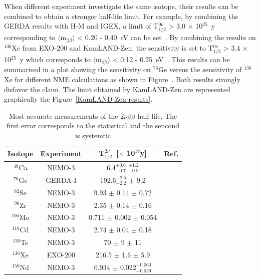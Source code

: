 \documentclass[main.tex]{subfiles}
\begin{document}
\NI When different experiment investigate the same isotope, their results can be combined to obtain a stronger half-life limit. For example, by combining the GERDA results with H-M and IGEX, a limit of T$_{\text{1/2}}^{\text{0}\nu}$ > 3.0 $\times$ 10$^{\text{25}}$~y corresponding to $\langle \text{m}_{\beta\beta} \rangle$ < 0.20 - 0.40~eV can be set~\cite{GERDA}.  By combining the results on $^{\text{136}}$Xe from EXO-200 and KamLAND-Zen, the sensitivity is set to T$_{\text{1/2}}^{\text{0}\nu}$ > 3.4 $\times$ 10$^{\text{25}}$~y which corresponds to $\langle \text{m}_{\beta\beta} \rangle$ < 0.12 - 0.25~eV~\cite{KamLAND-Zen}. This results can be summarised in a plot showing the sensitivity on $^{\text{76}}$Ge versus the sensitivity of $^{\text{136}}$Xe for different NME calculations as shown in Figure~\cite{Gerda-EXO-combined}. Both results strongly disfavor the claim. The limit obtained by KamLAND-Zen are represented graphically the Figure~\ref{KamLAND-Zen-results}.


\begin{table}[h!]
\centering
\begin{tabular}{cccc}
\toprule
Isotope & Experiment & T$_{\text{1/2}}^{\text{2}\nu}$~[$\times$ 10$^{\text{19}}$y]& Ref. \\
\midrule
$^{\text{48}}$Ca  & NEMO-3  & 6.4$^{+\text{0.6}}_{-\text{0.7}}$ $^{+\text{1.2}}_{-\text{0.9}}$ & \cite{NEMO3:Ca48} \\[0.1cm]
$^{\text{76}}$Ge  & GERDA-I & 192.6$^{+\text{2.5}}_{-\text{2.2}}$ $\pm$ 9.2 & \cite{Gerda2nubb} \\[0.1cm]
$^{\text{82}}$Se  & NEMO-3  & 9.93 $\pm$ 0.14 $\pm$ 0.72 & \cite{ThesisJMott} \\[0.1cm]
$^{\text{96}}$Zr  & NEMO-3  & 2.35 $\pm$ 0.14 $\pm$ 0.16 & \cite{NEMO3:Zr96} \\[0.1cm]
$^{\text{100}}$Mo & NEMO-3  & 0.711 $\pm$ 0.002 $\pm$ 0.054 & \cite{NEMO3:Mo100-pre} \\[0.1cm]
$^{\text{116}}$Cd & NEMO-3  & 2.74 $\pm$ 0.04 $\pm$ 0.18 & \cite{Arnold2016bed} \\[0.1cm]
$^{\text{130}}$Te & NEMO-3  & 70 $\pm$ 9 $\pm$ 11 & \cite{NEMO3:Te130} \\[0.1cm]
$^{\text{136}}$Xe & EXO-200 & 216.5 $\pm$ 1.6 $\pm$ 5.9 & \cite{EXO-200-2nubb} \\[0.1cm]
$^{\text{150}}$Nd & NEMO-3  & 0.934 $\pm$ 0.022$^{+\text{0.060}}_{-\text{0.059}}$  & \cite{NEMO3:Nd150} \\
\bottomrule
\end{tabular}
\caption{Most accurate measurements of the 2$\nu\beta\beta$ half-life. The first error corresponds to the statistical and the sencond is systemtic}
\label{tab:summaryBB2NUmeasurements}
\end{table}
\end{document}
